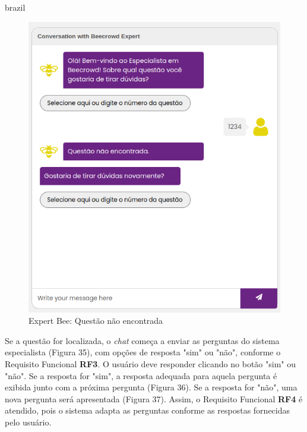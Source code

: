\begin{otherlanguage*}{brazil}
\begin{figure}[H]
    \centering
            \caption{Expert Bee: Questão não encontrada}
            \label{fig:ModeloConceitual}
        \includegraphics[scale=0.63]{pictures/desenvolvimento/expert_bee_questao_nao_encontrada.png}
\end{figure}

Se a questão for localizada, o \textit{chat} começa a enviar as perguntas do sistema especialista (Figura 35), com opções de resposta "sim" ou "não", conforme o Requisito Funcional \textbf{RF3}. O usuário deve responder clicando no botão "sim" ou "não". Se a resposta for "sim", a resposta adequada para aquela pergunta é exibida junto com a próxima pergunta (Figura 36). Se a resposta for "não", uma nova pergunta será apresentada (Figura 37). Assim, o Requisito Funcional \textbf{RF4} é atendido, pois o sistema adapta as perguntas conforme as respostas fornecidas pelo usuário.


\end{otherlanguage*}
